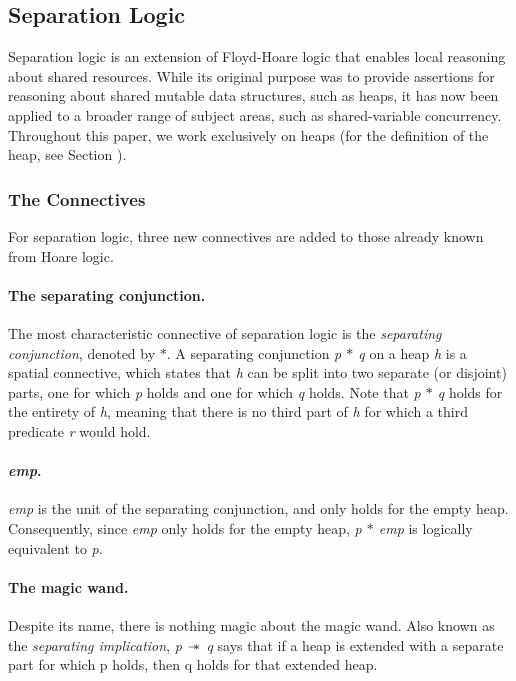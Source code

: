 \subsection{Separation Logic}
Separation logic is an extension of Floyd-Hoare logic that enables local reasoning about shared resources. While its original purpose was to provide assertions for reasoning about shared mutable data structures, such as heaps, it has now been applied to a broader range of subject areas, such as shared-variable concurrency. Throughout this paper, we work exclusively on heaps (for the definition of the heap, see Section ).

\subsubsection{The Connectives}
For separation logic, three new connectives are added to those already known from Hoare logic. 
\paragraph{The separating conjunction.}
The most characteristic connective of separation logic is the {\it separating conjunction}, denoted by {\it $\ast$}. A separating conjunction {\it p $\ast$ q} on a heap {\it h} is a spatial connective, which states that {\it h} can be split into two separate (or disjoint) parts, one for which {\it p} holds and one for which {\it q} holds. Note that {\it p $\ast$ q} holds for the entirety of {\it h}, meaning that there is no third part of {\it h} for which a third predicate {\it r} would hold.

\paragraph{{\it emp}.}
{\it emp} is the unit of the separating conjunction, and only holds for the empty heap. Consequently, since {\it emp} only holds for the empty heap, {\it p $\ast$ emp} is logically equivalent to {\it p}.

\paragraph{The magic wand.}
Despite its name, there is nothing magic about the magic wand. Also known as the {\it separating implication}, {\it p $\wand$ q} says that if a heap is extended with a separate part for which p holds, then q holds for that extended heap.

